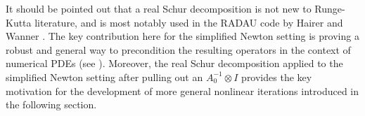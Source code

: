 \documentclass[review]{siamart}
\makeatletter
\newcommand{\todo}[1]{\textcolor{red}{[TODO\@: #1]}}
\makeatother
\begin{document}
%
\begin{remark}
It should be pointed out that a real Schur decomposition is not new to
Runge-Kutta literature, and is most notably used in the RADAU code
by Hairer and Wanner \cite{hairer99}.
The key contribution here for the simplified Newton setting is proving a
robust and general way to precondition the resulting operators in the
context of numerical PDEs (see ). Moreover, the real
Schur decomposition applied to the simplified Newton setting after
pulling out an $A_0^{-1}\otimes I$ provides the key motivation for
the development of more general nonlinear iterations introduced in
the following section.
\end{remark}


%

\end{document}
